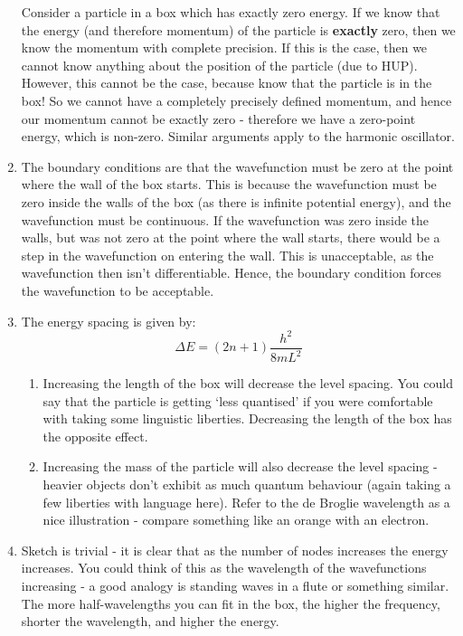 \documentclass{memoir}[11pt,oneside,a4paper,openany]
\begin{document}
\begin{enumerate}
		Consider a particle in a box which has exactly zero energy. If we know that the energy (and therefore momentum) of the particle is \textbf{exactly} zero, then we know the momentum with complete precision. If this is the case, then we cannot know anything about the position of the particle (due to HUP). However, this cannot be the case, because know that the particle is in the box! So we cannot have a completely precisely defined momentum, and hence our momentum cannot be exactly zero - therefore we have a zero-point energy, which is non-zero. Similar arguments apply to the harmonic oscillator. 
	\item The boundary conditions are that the wavefunction must be zero at the point where the wall of the box starts. This is because the wavefunction must be zero inside the walls of the box (as there is infinite potential energy), and the wavefunction must be continuous. If the wavefunction was zero inside the walls, but was not zero at the point where the wall starts, there would be a step in the wavefunction on entering the wall. This is unacceptable, as the wavefunction then isn't differentiable. Hence, the boundary condition forces the wavefunction to be acceptable.
	\item The energy spacing is given by:
		\begin{equation}
			\Delta E = (2n+1)\frac{h^2}{8mL^2}
		\end{equation}
		\begin{enumerate}
			\item Increasing the length of the box will decrease the level spacing. You could say that the particle is getting `less quantised' if you were comfortable with taking some linguistic liberties. Decreasing the length of the box has the opposite effect.
			\item Increasing the mass of the particle will also decrease the level spacing - heavier objects don't exhibit as much quantum behaviour (again taking a few liberties with language here). Refer to the de Broglie wavelength as a nice illustration - compare something like an orange with an electron.
		\end{enumerate}
	\item Sketch is trivial - it is clear that as the number of nodes increases the energy increases. You could think of this as the wavelength of the wavefunctions increasing - a good analogy is standing waves in a flute or something similar. The more half-wavelengths you can fit in the box, the higher the frequency, shorter the wavelength, and higher the energy.

\end{enumerate}
\end{document}
